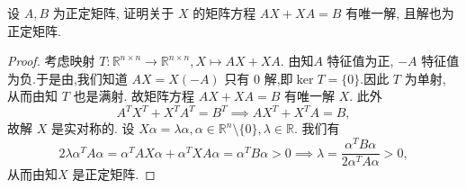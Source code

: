 \documentclass[../../main.tex]{subfiles}
\begin{document}
\begin{example}
设 \( A,B \) 为正定矩阵, 证明关于 \( X \) 的矩阵方程 \( AX + XA = B \) 有唯一解, 且解也为正定矩阵.
\end{example}
\begin{proof}
考虑映射 \( T: \mathbb{R}^{n \times n} \to \mathbb{R}^{n \times n}, X \mapsto AX + XA \). 由知\( A \) 特征值为正, \( -A \) 特征值为负.于是由,我们知道 \( AX = X(-A) \) 只有 0 解,即$\ker T=\{0\}$.因此 \( T \) 为单射, 从而由知 \( T \) 也是满射. 故矩阵方程 \( AX + XA = B \) 有唯一解 \( X \). 此外
\[
A^T X^T + X^T A^T = B^T \implies AX^T + X^T A = B,
\]
故解 \( X \) 是实对称的. 设 \( X\alpha = \lambda\alpha, \alpha \in \mathbb{R}^n \setminus \{0\}, \lambda \in \mathbb{R} \). 我们有
\[
2\lambda\alpha^T A\alpha = \alpha^T AX\alpha + \alpha^T XA\alpha = \alpha^T B\alpha > 0 \implies \lambda = \frac{\alpha^T B\alpha}{2\alpha^T A\alpha} > 0,
\]
从而由知\( X \) 是正定矩阵.

\end{proof}
\end{document}
